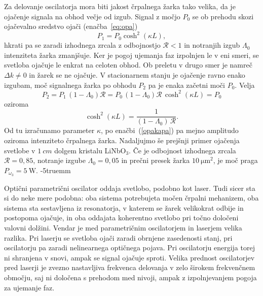 \pagebreak
Za delovanje oscilatorja mora biti jakost črpalnega žarka tako velika, da je 
ojačenje signala na obhod večje od izgub. Signal z močjo 
$P_0$ se ob prehodu skozi ojačevalno sredstvo ojači (enačba~\ref{eq:opa})
\begin{equation}
P_1 = P_0 \cosh^2 (\kappa L),
\end{equation}
hkrati pa se zaradi izhodnega zrcala z odbojnostjo $\mathcal{R}<1$ in notranjih izgub $\Lambda_0$ 
intenziteta žarka zmanjšuje. Ker je pogoj ujemanja faz izpolnjen le v eni smeri, se svetloba
ojačuje le enkrat na celoten obhod. Ob preletu v drugo smer je namreč $\Delta k \neq 0$ in 
žarek se ne ojačuje. V stacionarnem stanju je ojačenje ravno enako izgubam, moč 
signalnega žarka po obhodu $P_2$ pa je enaka začetni moči $P_0$. Velja
\begin{equation}
P_2 = P_1\,(1-\Lambda_0)\mathcal{R} = P_0 \,(1-\Lambda_0) \mathcal{R} \,\cosh^2 (\kappa L) = P_0
\end{equation}
oziroma
\begin{equation}
\cosh^2 (\kappa L) =\frac{1}{(1-\Lambda_0)\, \mathcal{R}}.
\end{equation}
Od tu izračunamo parameter $\kappa$, po enačbi~(\ref{opakapa}) pa mejno 
amplitudo oziroma intenziteto črpalnega žarka. Nadaljujmo še prejšnji primer ojačenja 
svetlobe v $1~\si{cm}$ dolgem kristalu LiNbO$_{3}$.
Če je odbojnost izhodnega zrcala $\mathcal{R}=0,85$, notranje izgube $\Lambda_0 = 0,05$ in prečni presek 
žarka $10~\si{\micro\metre^2}$, je moč praga $P_{\omega_3} = 5~\si{\watt}$.
\vglue-5truemm
\begin{remark}
Optični parametrični oscilator oddaja svetlobo, podobno kot laser. Tudi sicer
sta si do neke mere podobna: oba sistema potrebujeta močen črpalni mehanizem, oba sistema
sta sestavljena iz resonatorja, v katerem se žarek velikokrat odbije in postopoma ojačuje,
in oba oddajata koherentno svetlobo pri točno določeni valovni dolžini. Vendar
je med parametričnim oscilatorjem in laserjem velika razlika. Pri laserju se svetloba
ojači zaradi obrnjene zasedenosti stanj, pri oscilatorju pa 
zaradi nelinearnega optičnega pojava. Pri oscilatorju energija torej ni shranjena v
snovi, ampak se signal ojačuje sproti. Velika prednost oscilatorjev pred laserji 
je zvezno nastavljiva frekvenca delovanja v zelo širokem frekvenčnem območju, saj ni določena
s prehodom med nivoji, ampak z izpolnjevanjem pogoja za ujemanje faz.
\end{remark}

